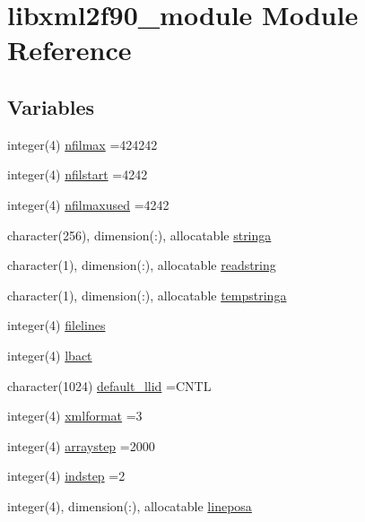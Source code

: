 \hypertarget{namespacelibxml2f90__module}{}\section{libxml2f90\+\_\+module Module Reference}
\label{namespacelibxml2f90__module}
\subsection*{Variables}
\begin{DoxyCompactItemize}
\item 
integer(4) \hyperlink{namespacelibxml2f90__module_ae803c4d10ecfbdc0b6624c004764524e}{nfilmax} =424242
\item 
integer(4) \hyperlink{namespacelibxml2f90__module_a76bbe7c27297a807f15421a654d7ca6b}{nfilstart} =4242
\item 
integer(4) \hyperlink{namespacelibxml2f90__module_a217fb75c146107a9cf2983b658274832}{nfilmaxused} =4242
\item 
character(256), dimension(\+:), allocatable \hyperlink{namespacelibxml2f90__module_ab661dc207b668f91bdee9a3efea3dd49}{stringa}
\item 
character(1), dimension(\+:), allocatable \hyperlink{namespacelibxml2f90__module_a791c6344181b9375ed7fc4470f4554aa}{readstring}
\item 
character(1), dimension(\+:), allocatable \hyperlink{namespacelibxml2f90__module_a55e059defbab12f54d54b8f44ad84777}{tempstringa}
\item 
integer(4) \hyperlink{namespacelibxml2f90__module_a63c8792c8a009d1875c66340984b0879}{filelines}
\item 
integer(4) \hyperlink{namespacelibxml2f90__module_a958e698155df02283f763fc986f1785f}{lbact}
\item 
character(1024) \hyperlink{namespacelibxml2f90__module_a2dc8e61fe0a8b9c60b5197984e7b30ae}{default\+\_\+llid} =\textquotesingle{}C\+N\+TL\textquotesingle{}
\item 
integer(4) \hyperlink{namespacelibxml2f90__module_a6e7d9498a3938eb57c8ff2020118098e}{xmlformat} =3
\item 
integer(4) \hyperlink{namespacelibxml2f90__module_a03a53e403791ec1e112a71f5f2831522}{arraystep} =2000
\item 
integer(4) \hyperlink{namespacelibxml2f90__module_aef9ff21f71177c723fbac94eeafcb733}{indstep} =2
\item 
integer(4), dimension(\+:), allocatable \hyperlink{namespacelibxml2f90__module_ad86b3bf7c2ae6ea6856befb154df888f}{lineposa}

\end{DoxyCompactItemize}
